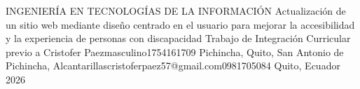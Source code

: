 \documentclass[12pt,a4paper,oneside]{report}
\begin{document}
{INGENIERÍA EN TECNOLOGÍAS DE LA INFORMACIÓN} %
{Actualización de un sitio web mediante diseño centrado en el usuario para mejorar la accesibilidad y la experiencia de personas con discapacidad} %
{Trabajo de Integración Curricular previo a \UTIFraseTituloPortada} %
{\UTIDatosAutores
{Cristofer Paez}{masculino}{1754161709}
{Pichincha, Quito, San Antonio de Pichincha, Alcantarillas}{cristoferpaez57@gmail.com}{0981705084}}
{} %
{Quito, Ecuador} %
{2026} %

\UTIFrontMatter


















\UTIMainMatter
\end{document}
